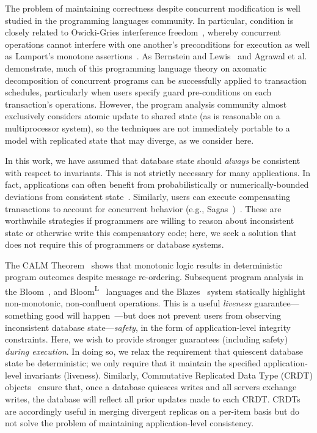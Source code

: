  The problem of maintaining correctness
despite concurrent modification is well studied in the programming
languages community. In particular, \iconfluence condition is closely
related to Owicki-Gries interference
  freedom~\cite{owickigries}, whereby concurrent operations cannot
interfere with one another's preconditions for execution as well as
Lamport's monotone assertions~\cite{lamport-safety}. As
Bernstein and Lewis~\cite{decomp-semantics} and Agrawal et
al.~\cite{agarwal-consistency} demonstrate, much of this programming
language theory on axomatic decomposition of concurrent programs can
be successfully applied to transaction schedules, particularly when
users specify guard pre-conditions on each transaction's
operations. However, the program analysis community almost exclusively
considers atomic update to shared state (as is reasonable on a
multiprocessor system), so the techniques are not immediately portable
to a model with replicated state that may diverge, as we consider
here.

 In this work, we have assumed that
database state should \textit{always} be consistent with respect to
invariants. This is not strictly necessary for many applications. In
fact, applications can often benefit from probabilistically or
numerically-bounded deviations from consistent
state~\cite{epsilon-divergence}. Similarly, users can execute
compensating transactions to account for concurrent behavior (e.g.,
Sagas~\cite{sagas})~\cite{ic-survey,ic-survey-two}. These are worthwhile
strategies if programmers are willing to reason about inconsistent
state or otherwise write this compensatory code; here,
we seek a solution that does not require this of programmers or
database systems.

 The CALM
Theorem~\cite{ameloot-calm} shows that monotonic logic results in
deterministic program outcomes despite message re-ordering. Subsequent
program analysis in the Bloom~\cite{calm}, and
Bloom\textsuperscript{L}~\cite{blooml} languages and the
Blazes~\cite{blazes} system statically highlight non-monotonic,
non-confluent operations. This is a useful \textit{liveness}
guarantee---something good will happen~\cite{lamport-safety}---but
does not prevent users from observing inconsistent database
state---\textit{safety}, in the form of application-level integrity
constraints.  Here, we wish to provide stronger guarantees (including
safety) \textit{during execution}. In doing so, we relax the
requirement that quiescent database state be deterministic; we only
require that it maintain the specified application-level invariants
(liveness). Similarly, Commutative Replicated Data Type (CRDT)
objects~\cite{crdt} ensure that, once a database quiesces writes and
all servers exchange writes, the database will reflect all prior
updates made to each CRDT. CRDTs are accordingly useful in merging
divergent replicas on a per-item basis but do not solve the problem of
maintaining application-level consistency.


